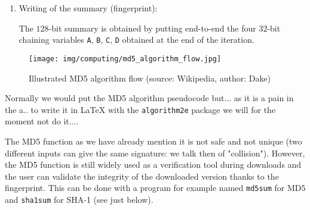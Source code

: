\begin{enumerate}
		\item Writing of the summary (fingerprint):
		
		The $128$-bit summary is obtained by putting end-to-end the four $32$-bit chaining variables \texttt{A}, \texttt{B}, \texttt{C}, \texttt{D} obtained at the end of the iteration.
	\end{enumerate}
	\begin{figure}[H]
		\centering
		\texttt{[image: img/computing/md5\_algorithm\_flow.jpg]}
		\caption[Illustrated MD5 algorithm flow]{Illustrated MD5 algorithm flow (source: Wikipedia, author: Dake)}
	\end{figure}
	\begin{tcolorbox}[title=Remark,colframe=black,arc=10pt]
	Normally we would put the MD5 algorithm pseudocode but... as it is a pain in the a.. to write it in LaTeX with the \texttt{algorithm2e} package we will for the moment not do it....
	\end{tcolorbox}
	The MD5 function as we have already mention it is not safe and not unique (two different inputs can give the same signature: we talk then of "collision"). However, the MD5 function is still widely used as a verification tool during downloads and the user can validate the integrity of the downloaded version thanks to the fingerprint. This can be done with a program for example named \texttt{md5sum} for MD5 and \texttt{sha1sum} for SHA-1 (see just below).
	
